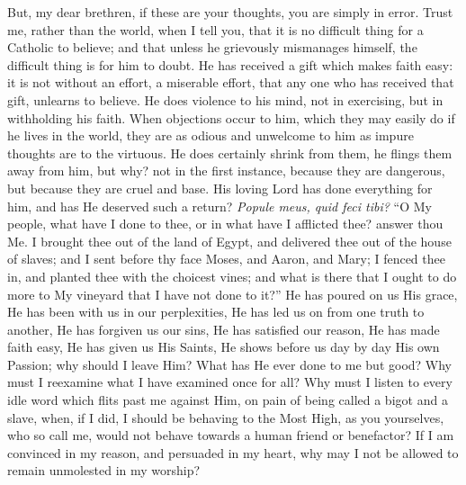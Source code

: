 But, my dear brethren, if these are your thoughts, you are simply
in error. Trust me, rather than the world, when I tell you, that it is
no difficult thing for a Catholic to believe; and that unless he
grievously mismanages himself, the difficult thing is for him to
doubt. He has received a gift which makes faith easy: it is not
without an effort, a miserable effort, that any one who has received
that gift, unlearns to believe. He does violence to his mind, not in
exercising, but in withholding his faith. When objections occur to
him, which they may easily do if he lives in the world, they are as
odious and unwelcome to him as impure thoughts are to the virtuous. He
does certainly shrink from them, he flings them away from him, but
why? not in the first instance, because they are dangerous, but
because they are cruel and base. His loving Lord has done everything
for him, and has He deserved such a return? \emph{Popule meus, quid feci
tibi?} ``O My people, what have I done to thee, or in what have
I afflicted thee? answer thou Me. I brought thee out of the land of
Egypt, and delivered thee out of the house of slaves; and I sent
before thy face Moses, and Aaron, and Mary; I fenced thee in, and
planted thee with the choicest vines; and what is there that I ought
to do more to My vineyard that I have not done to it?'' He has
poured on us His grace, He has been with us in our perplexities, He
has led us on from one truth to another, He has forgiven us our sins,
He has satisfied our reason, He has made faith easy, He has given us
His Saints, He shows before us day by day His own Passion; why should
I leave Him? What has He ever done to me but good? Why must I
reexamine what I have examined once for all? Why must I listen to
every idle word which flits past me against Him, on pain of being
called a bigot and a slave, when, if I did, I should be behaving to
the Most High, as you yourselves, who so call me, would not behave
towards a human friend or benefactor? If I am convinced in my reason,
and persuaded in my heart, why may I not be allowed to remain
unmolested in my worship?

